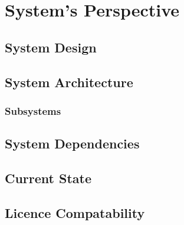 \chapter{System's Perspective}

\section{System Design}

\section{System Architecture}

\subsection{Subsystems}

\section{System Dependencies}

\section{Current State}

\section{Licence Compatability}




